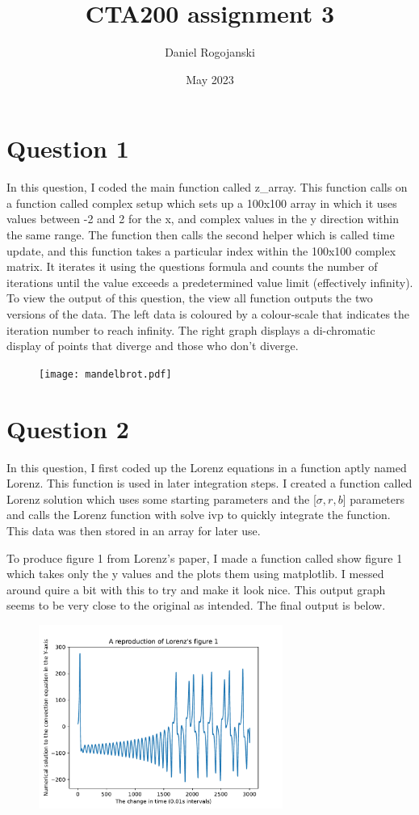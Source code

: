 \documentclass{article}
\title{CTA200 assignment 3}
\author{Daniel Rogojanski}
\date{May 2023}
\begin{document}
\maketitle

\section*{Question 1}

In this question, I coded the main function called z\_array. This function calls on a function called complex setup which sets up a 100x100 array in which it uses values between -2 and 2 for the x, and complex values in the y direction within the same range. The function then calls the second helper which is called time update, and this function takes a particular index within the 100x100 complex matrix. It iterates it using the questions formula and counts the number of iterations until the value exceeds a predetermined value limit (effectively infinity). To view the output of this question, the view all function outputs the two versions of the data. The left data is coloured by a colour-scale that indicates the iteration number to reach infinity. The right graph displays a di-chromatic display of points that diverge and those who don't diverge. 

\begin{figure}[htp]
    \centering
    \texttt{[image: mandelbrot.pdf]}
\end{figure}

\section*{Question 2}

In this question, I first coded up the Lorenz equations in a function aptly named Lorenz. This function is used in later integration steps. I created a function called Lorenz solution which uses some starting parameters and the [$\sigma, r, b$] parameters and calls the Lorenz function with solve ivp to quickly integrate the function. This data was then stored in an array for later use.

To produce figure 1 from Lorenz's paper, I made a function called show figure 1 which takes only the y values and the plots them using matplotlib. I messed around quire a bit with this to try and make it look nice. This output graph seems to be very close to the original as intended. The final output is below. 

\begin{figure}[htp]
    \centering
    \includegraphics[width=8cm]{Figure_1.pdf}
\end{figure}
          
\end{document}
